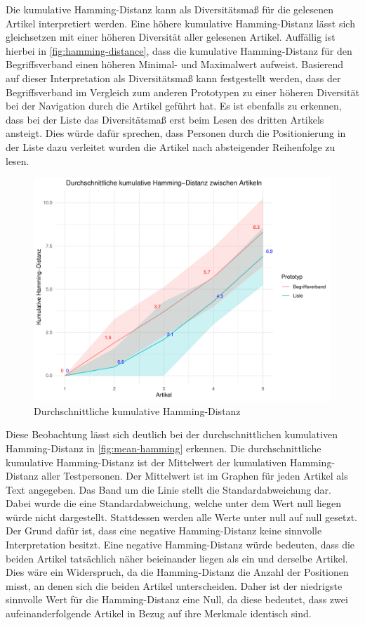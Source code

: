 Die kumulative Hamming-Distanz kann als Diversitätsmaß für die gelesenen Artikel interpretiert werden.
Eine höhere kumulative Hamming-Distanz lässt sich gleichsetzen mit einer höheren Diversität aller gelesenen Artikel.
Auffällig ist hierbei in \autoref{fig:hamming-distance}, dass die kumulative Hamming-Distanz für den Begriffsverband einen höheren Minimal- und Maximalwert aufweist.
Basierend auf dieser Interpretation als Diversitätsmaß kann festgestellt werden, dass der Begriffsverband im Vergleich zum anderen Prototypen zu einer höheren Diversität bei der Navigation durch die Artikel geführt hat.
Es ist ebenfalls zu erkennen, dass bei der Liste das Diversitätsmaß erst beim Lesen des dritten Artikels ansteigt.
Dies würde dafür sprechen, dass Personen durch die Positionierung in der Liste dazu verleitet wurden die Artikel nach absteigender Reihenfolge zu lesen. \\

\begin{figure}[!ht]
    \centering
    \includegraphics[width=0.8\columnwidth]{figures/comparison-line.pdf}
    \caption{\label{fig:mean-hamming}Durchschnittliche kumulative Hamming-Distanz}
\end{figure}

Diese Beobachtung lässt sich deutlich bei der durchschnittlichen kumulativen Hamming-Distanz in \autoref{fig:mean-hamming} erkennen.
Die durchschnittliche kumulative Hamming-Distanz ist der Mittelwert der kumulativen Hamming-Distanz aller Testpersonen.
Der Mittelwert ist im Graphen für jeden Artikel als Text angegeben.
Das Band um die Linie stellt die Standardabweichung dar.
Dabei wurde die eine Standardabweichung, welche unter dem Wert null liegen würde nicht dargestellt.
Stattdessen werden alle Werte unter null auf null gesetzt.
Der Grund dafür ist, dass eine negative Hamming-Distanz keine sinnvolle Interpretation besitzt.
Eine negative Hamming-Distanz würde bedeuten, dass die beiden Artikel tatsächlich näher beieinander liegen als ein und derselbe Artikel.
Dies wäre ein Widerspruch, da die Hamming-Distanz die Anzahl der Positionen misst, an denen sich die beiden Artikel unterscheiden.
Daher ist der niedrigste sinnvolle Wert für die Hamming-Distanz eine Null, da diese bedeutet, dass zwei aufeinanderfolgende Artikel in Bezug auf ihre Merkmale identisch sind.\\

